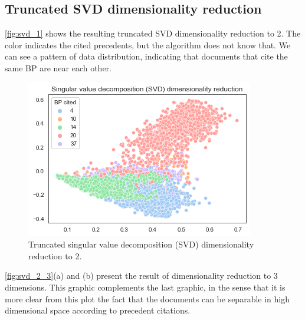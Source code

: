 \documentclass[twocolumn]{article}
\begin{document}
            \subsection{Truncated SVD dimensionality reduction}

                  \autoref{fig:svd_1} shows the resulting truncated SVD dimensionality reduction to 2. The color indicates the cited precedents, but the algorithm does not know that. We can see a pattern of data distribution, indicating that documents that cite the same BP are near each other.

                  \begin{figure}[H]
                        \includegraphics[width=\linewidth]{svd_1.png}
                        \caption{Truncated singular value decomposition (SVD) dimensionality reduction to 2.}
                        \label{fig:svd_1}
                  \end{figure}

                  \autoref{fig:svd_2_3}(a) and (b) present the result of dimensionality reduction to 3 dimensions. This graphic complements the last graphic, in the sense that it is more clear from this plot the fact that the documents can be separable in high dimensional space according to precedent citations.
\end{document}
